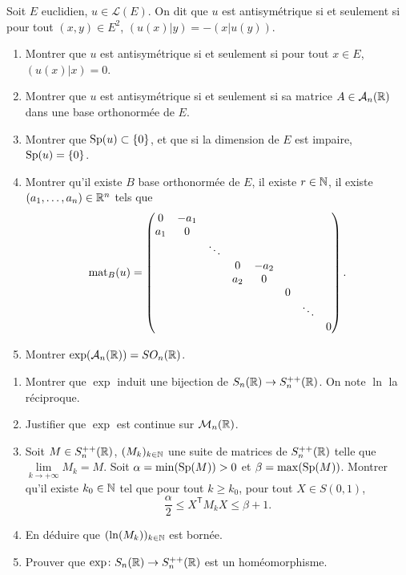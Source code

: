 \documentclass[12pt]{article}
\begin{document}
\begin{exercise}
	Soit $E$ euclidien, $u\in\mathcal{L}(E)$. On dit que $u$ est antisymétrique si et seulement si pour tout $(x,y)\in E^{2}$, $(u(x)|y)=-(x|u(y))$.
	\begin{enumerate}
		\item Montrer que $u$ est antisymétrique si et seulement si pour tout $x\in E$, $(u(x)|x)=0$.
		\item Montrer que $u$ est antisymétrique si et seulement si sa matrice $A\in\mathcal{A}_{n}(\mathbb{R})$ dans une base orthonormée de $E$.
		\item Montrer que $\operatorname{Sp}(u)\subset\left\lbrace0\right\rbrace$, et que si la dimension de $E$ est impaire, $\operatorname{Sp}(u)=\left\lbrace0\right\rbrace$.
		\item Montrer qu'il existe $B$ base orthonormée de $E$, il existe $r\in\mathbb{N}$, il existe $(a_{1},\dots,a_{n})\in\mathbb{R}^{n}$ tels que 
		\begin{equation}
			\operatorname{mat}_{B}(u)=
			\begin{pmatrix}
				0 & -a_1\\
				a_{1} & 0\\
				&&\ddots\\
				&&&0&-a_2\\
				&&&a_2 &0\\
				&&&&&0\\
				&&&&&&\ddots\\
				&&&&&&&0
			\end{pmatrix}.
		\end{equation}
		\item Montrer $\exp(\mathcal{A}_{n}(\mathbb{R}))=SO_{n}(\mathbb{R})$.
	\end{enumerate}
\end{exercise}

\begin{exercise}
	\phantom{}
	\begin{enumerate}
		\item Montrer que $\exp$ induit une bijection de $S_n(\mathbb{R})\to S_n^{++}(\mathbb{R})$. On note $\ln$ la réciproque.
		\item Justifier que $\exp$ est continue sur $\mathcal{M}_n(\mathbb{R})$.
		\item Soit $M\in S_n^{++}(\mathbb{R})$, $(M_k)_{k\in\mathbb{N}}$ une suite de matrices de $S_n^{++}(\mathbb{R})$ telle que $\lim\limits_{k\to+\infty}M_k=M$. Soit $\alpha=\min(\operatorname{Sp}(M))>0$ et $\beta=\max(\operatorname{Sp}(M))$. Montrer qu'il existe $k_{0}\in\mathbb{N}$ tel que pour tout $k\geqslant k_{0}$, pour tout $X\in S(0,1)$, 
		\begin{equation}
			\frac{\alpha}{2}\leqslant X^{\mathsf{T}}M_k X\leqslant \beta+1.
		\end{equation}
		\item En déduire que $(\ln(M_k))_{k\in\mathbb{N}}$ est bornée.
		\item Prouver que $\exp\colon S_n(\mathbb{R})\to S_n^{++}(\mathbb{R})$ est un homéomorphisme.
	\end{enumerate}
\end{exercise}
\end{document}
